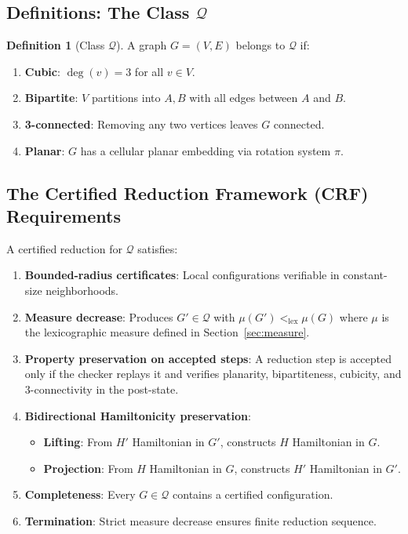 \documentclass[12pt]{article}
\theoremstyle{definition}
\newtheorem{definition}[theorem]{Definition}
\begin{document}
\subsection{Definitions: The Class $\mathcal{Q}$}
\begin{definition}[Class $\mathcal{Q}$]
A graph $G = (V, E)$ belongs to $\mathcal{Q}$ if:
\begin{enumerate}
    \item \textbf{Cubic}: $\deg(v) = 3$ for all $v \in V$.
    \item \textbf{Bipartite}: $V$ partitions into $A, B$ with all edges between $A$ and $B$.
    \item \textbf{3-connected}: Removing any two vertices leaves $G$ connected.
    \item \textbf{Planar}: $G$ has a cellular planar embedding via rotation system $\pi$.
\end{enumerate}
\end{definition}

\subsection{The Certified Reduction Framework (CRF) Requirements}
A certified reduction for $\mathcal{Q}$ satisfies:
\begin{enumerate}
    \item[(CRF1)] \textbf{Bounded-radius certificates}: Local configurations verifiable in constant-size neighborhoods.
    \item[(CRF2)] \textbf{Measure decrease}: Produces $G' \in \mathcal{Q}$ with $\mu(G') <_{\text{lex}} \mu(G)$ where $\mu$ is the lexicographic measure defined in Section~\ref{sec:measure}.
    \item[(CRF3)] \textbf{Property preservation on accepted steps}: A reduction step is accepted only if the checker replays it and verifies planarity, bipartiteness, cubicity, and 3-connectivity in the post-state.
    \item[(CRF4)] \textbf{Bidirectional Hamiltonicity preservation}: 
    \begin{itemize}
        \item \textbf{Lifting}: From $H'$ Hamiltonian in $G'$, constructs $H$ Hamiltonian in $G$.
        \item \textbf{Projection}: From $H$ Hamiltonian in $G$, constructs $H'$ Hamiltonian in $G'$.
    \end{itemize}
    \item[(CRF5)] \textbf{Completeness}: Every $G \in \mathcal{Q}$ contains a certified configuration.
    \item[(CRF6)] \textbf{Termination}: Strict measure decrease ensures finite reduction sequence.
\end{enumerate}
\end{document}
